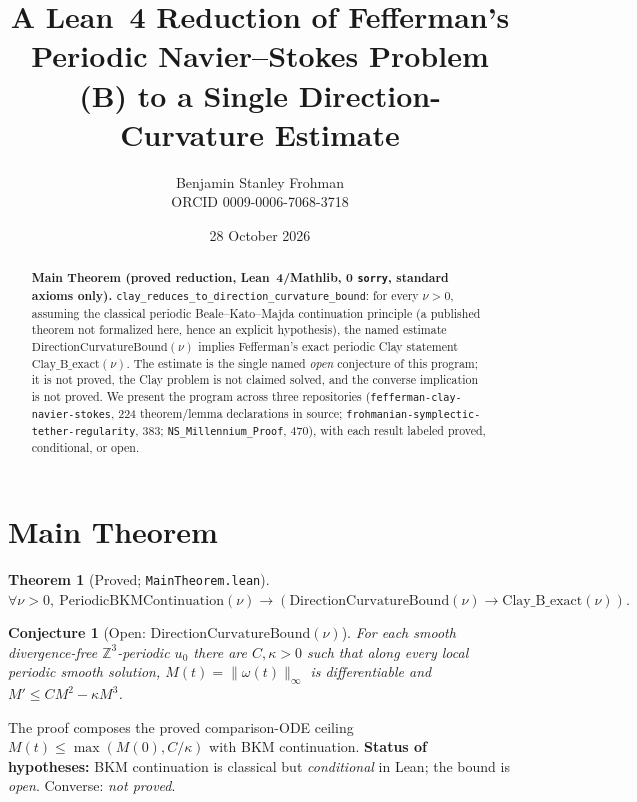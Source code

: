 \documentclass[11pt]{article}
\title{A Lean~4 Reduction of Fefferman's Periodic Navier--Stokes Problem (B) to a Single Direction-Curvature Estimate}
\author{Benjamin Stanley Frohman\\ORCID 0009-0006-7068-3718}
\date{28 October 2026}
\newtheorem{theorem}{Theorem}\newtheorem{conjecture}{Conjecture}
\begin{document}
\maketitle
\begin{abstract}
\textbf{Main Theorem (proved reduction, Lean~4/Mathlib, 0 \texttt{sorry}, standard axioms only).} \texttt{clay\_reduces\_to\_direction\_curvature\_bound}: for every $\nu>0$, assuming the classical periodic Beale--Kato--Majda continuation principle (a published theorem not formalized here, hence an explicit hypothesis), the named estimate $\mathrm{DirectionCurvatureBound}(\nu)$ implies Fefferman's exact periodic Clay statement $\mathrm{Clay\_B\_exact}(\nu)$. The estimate is the single named \emph{open} conjecture of this program; it is not proved, the Clay problem is not claimed solved, and the converse implication is not proved. We present the program across three repositories (\texttt{fefferman-clay-navier-stokes}, 224 theorem/lemma declarations in source; \texttt{frohmanian-symplectic-tether-regularity}, 383; \texttt{NS\_Millennium\_Proof}, 470), with each result labeled proved, conditional, or open.
\end{abstract}
\section{Main Theorem}
\begin{theorem}[Proved; \texttt{MainTheorem.lean}]
$\forall\nu>0,\ \mathrm{PeriodicBKMContinuation}(\nu)\to(\mathrm{DirectionCurvatureBound}(\nu)\to\mathrm{Clay\_B\_exact}(\nu)).$
\end{theorem}
\begin{conjecture}[Open: $\mathrm{DirectionCurvatureBound}(\nu)$]
For each smooth divergence-free $\mathbb{Z}^3$-periodic $u_0$ there are $C,\kappa>0$ such that along every local periodic smooth solution, $M(t)=\|\omega(t)\|_\infty$ is differentiable and $M'\le C M^2-\kappa M^3$.
\end{conjecture}
The proof composes the proved comparison-ODE ceiling $M(t)\le\max(M(0),C/\kappa)$ with BKM continuation. \textbf{Status of hypotheses:} BKM continuation is classical but \emph{conditional} in Lean; the bound is \emph{open}. Converse: \emph{not proved}.
\end{document}
